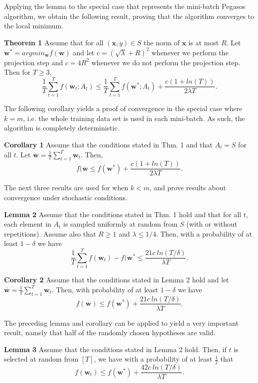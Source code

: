 \documentclass{article}
\begin{document}
Applying the lemma to the special case that represents the mini-batch Pegasos algorithm, we obtain the
following result, proving that the algorithm converges to the local minimum.

\textbf{Theorem 1} Assume that for all $(\mathbf{x},y)\in S$ the norm of $\mathbf{x}$ is at most $R$. Let
$\mathbf{w}^*=argmin_{\mathbf{w}}f(\mathbf{w})$ and let $c=(\sqrt{\lambda}+R)^2$ whenever we perform the
projection step and $c=4R^2$ whenever we do not perform the projection step. Then for $T\geq 3$,
$$\frac{1}{T}\sum_{t=1}^Tf(\mathbf{w}_t;A_t)\leq \frac{1}{T}\sum_{t=1}^Tf(\mathbf{w}^*;A_t)+\frac{c(1+ln(T))}{2\lambda T}.$$

The following corollary yields a proof of convergence in the special case where $k=m$, i.e.
the whole training data set is used in each mini-batch. As such, the algorithm is completely deterministic.

\textbf{Corollary 1} Assume that the conditions stated in Thm. 1 and that $A_t=S$ for all $t$. Let
$\overline{\mathbf{w}}=\frac{1}{T}\sum_{t=1}^T\mathbf{w}_t$. Then,
$$f(\overline{\mathbf{w}}\leq f(\mathbf{w}^*)+\frac{c(1+ln(T))}{2\lambda T}.$$

The next three results are used for when $k<m$, and prove results about convergence under stochastic
conditions.


\textbf{Lemma 2} Assume that the conditions stated in Thm. 1 hold and that for all $t$, each element in $A_t$ is sampled uniformly at random from $S$ (with or without repetitions). Assume also that $R\geq 1$ and $\lambda \leq 1/4$. Then, with a probability of at least $1-\delta$ we have
$$\frac{1}{T}\sum_{t=1}^{T}f(\mathbf{w}_t)-f(\mathbf{w}^*\leq \frac{21c\ ln(T/\delta)}{\lambda T}.$$

\textbf{Corollary 2} Assume that the conditions stated in Lemma 2 hold and let $\overline{\mathbf{w}}=\frac{1}{T}\sum_{t=1}^T\mathbf{w}_t$. Then, with probability of at least $1-\delta$ we have
$$f(\overline{\mathbf{w}})\leq f(\mathbf{w}^*)+\frac{21c\ ln(T/\delta)}{\lambda T}.$$

The preceding lemma and corollary can be applied to yield a very important result, namely that half
of the randomly chosen hypotheses are valid.

\textbf{Lemma 3} Assume that the conditions stated in Lemma 2 hold. Then, if $t$ is selected at random
from $[T]$, we have with a probability of at least $\frac{1}{2}$ that
$$f(\mathbf{w}_t)\leq f(\mathbf{w}^*)+\frac{42c\ ln(T/\delta)}{\lambda T}.$$
\end{document}
